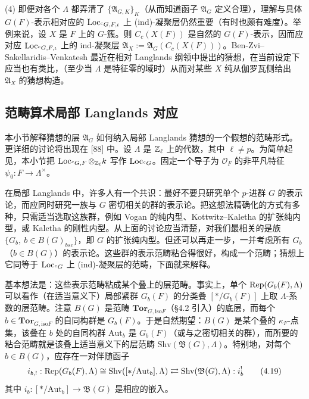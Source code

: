 (4) 即便对各个 $\Lambda$ 都弄清了 $\{\mathfrak A_{G,K}\}_K$（从而知道函子 $\mathfrak A_G$ 定义合理），理解与具体 $G(F)$-表示相对应的 $\operatorname{Loc}_{{}^{c}G,F,\iota}$ 上 (ind)-凝聚层仍然重要（有时也颇有难度）。举例来说，设 $X$ 是 $F$ 上的 $G$-簇。则 $C_c(X(F))$ 是自然的 $G(F)$-表示，因而应对应 $\operatorname{Loc}_{{}^{c}G,F,\iota}$ 上的 ind-凝聚层 $\mathfrak A_X:=\mathfrak A_G(C_c(X(F)))$。Ben-Zvi–Sakellaridis–Venkatesh 最近在相对 Langlands 纲领中提出的猜想，在当前设定下应当也有类比，（至少当 $\Lambda$ 是特征零的域时）从而对某些 $X$ 纯从伽罗瓦侧给出 $\mathfrak A_X$ 的猜想构造。

\subsection{范畴算术局部 Langlands 对应}\label{sec:a2-4-6}

本小节解释猜想的层 $\mathfrak A_G$ 如何纳入局部 Langlands 猜想的一个假想的范畴形式。更详细的讨论将出现在 [88] 中。设 $\Lambda$ 是 $\mathbb{Z}_\ell$ 上的代数，其中 $\ell\ne p$。为简单起见，本小节把 $\operatorname{Loc}_{{}^{c}G,F}\otimes_{\mathbb{Z}_\ell}k$ 写作 $\operatorname{Loc}_{{}^{c}G}$。固定一个导子为 $\mathcal O_F$ 的非平凡特征 $\psi_0:F\to\Lambda^\times$。

在局部 Langlands 中，许多人有一个共识：最好不要只研究单个 $p$-进群 $G$ 的表示论，而应同时研究一族与 $G$ 密切相关的群的表示论。把这想法精确化的方式有多种，只需适当选取这族群，例如 Vogan 的纯内型、Kottwitz–Kaletha 的扩张纯内型，或 Kaletha 的刚性内型。从上面的讨论应当清楚，对我们最相关的是族 $\{G_b,\ b\in B(G)_{bsc}\}$，即 $G$ 的扩张纯内型。但还可以再走一步，一并考虑所有 $G_b$（$b\in B(G)$）的表示论。这些群的表示范畴粘合得很好，构成一个范畴；猜想上它同等于 $\operatorname{Loc}_{{}^{c}G}$ 上 (ind)-凝聚层的范畴，下面就来解释。

基本想法是：这些表示范畴粘成某个叠上的层范畴。事实上，单个 $\operatorname{Rep}(G_b(F),\Lambda)$ 可以看作（在适当意义下）局部紧群 $G_b(F)$ 的分类叠 $[*/G_b(F)]$ 上取 $\Lambda$-系数的层范畴。注意 $B(G)$ 是范畴 $\mathbf{Tor}_{G,\mathrm{iso}F}$（§4.2 引入）的底层，而每个 $b\in\mathbf{Tor}_{G,\mathrm{iso}F}$ 的自同构群是 $G_b(F)$。于是自然期望：$B(G)$ 是某个叠的 $\kappa_F$-点集，该叠在 $b$ 处的自同构群 $\mathrm{Aut}_b$ 是 $G_b(F)$（或与之密切相关的群），而所要的粘合范畴就是该叠上适当意义下的层范畴 $\mathrm{Shv}(\mathfrak B(G),\Lambda)$。特别地，对每个 $b\in B(G)$，应存在一对伴随函子
\begin{equation}
i_{b,!}:\operatorname{Rep}(G_b(F),\Lambda)\cong\mathrm{Shv}([*/{\mathrm{Aut}_b}],\Lambda)\rightleftarrows\mathrm{Shv}(\mathfrak B(G),\Lambda):i^!_b \tag{4.19}\label{eq:a2-4-19}
\end{equation}
其中 $i_b:[*/{\mathrm{Aut}_b}]\to\mathfrak B(G)$ 是相应的嵌入。


